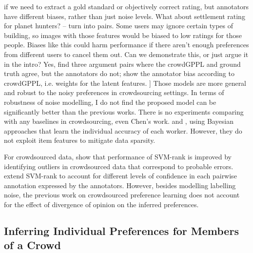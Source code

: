 {if we need to extract a gold standard or objectively correct rating, but annotators
have different biases, rather than just noise levels. What about settlement rating for
planet hunters? -- turn into pairs. Some users may ignore certain types of building,
so images with those features would be biased to low ratings for those people. 
Biases like this could harm performance if there aren't enough preferences from 
different users to cancel them out.
Can we demonstrate this, or just argue it in the intro?
Yes, find three argument pairs where the crowdGPPL and ground truth agree, but the 
annotators do not; show the annotator bias according to crowdGPPL, i.e. weights for the 
latent features.  
]
Those models are more general and robust to the noisy preferences in crowdsourcing settings.
In terms of robustness of noise modelling, I do not find the proposed model can be significantly better than the previous works.  There is no experiments comparing with any baselines in crowdsourcing, even Chen's work. 
}
and \citet{wang2016blind},
using Bayesian approaches that learn the individual accuracy of each worker.
However, they do not %
exploit item features to mitigate data sparsity.


For crowdsourced data, \citet{fu2016robust} show that performance
of SVM-rank is improved by identifying outliers in crowdsourced data
that correspond to probable errors.
\citet{uchida2017entity} extend SVM-rank to account for different levels of confidence in each pairwise annotation expressed
by the annotators.
However, besides modelling labelling noise, 
the previous work on crowdsourced preference learning does not 
account for the effect of divergence of opinion on the inferred preferences.

\subsection{Inferring Individual Preferences for Members of a Crowd}

